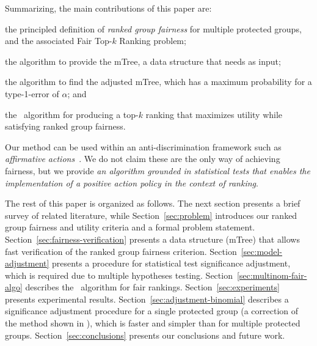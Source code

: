 Summarizing, the main contributions of this paper are:
\begin{compactenum}
	\item the principled definition of \emph{ranked group fairness} for multiple protected groups, and the associated  {\sc Fair Top-$k$ Ranking problem};
	\item the \algoComputeMTree algorithm to provide the mTree, a data structure that \algoFAIR needs as input;
	\item the \algoCorrect algorithm to find the adjusted mTree, which has a maximum probability for a type-1-error of $\alpha$; and
	\item the \algoFAIR\ algorithm for producing a top-$k$ ranking that maximizes utility while satisfying ranked group fairness.
\end{compactenum}

Our method can be used within an anti-discrimination framework such as \emph{affirmative actions}~\cite{sowell2005affirmative}.
%
We do not claim these are the only way of achieving fairness, but we provide \emph{an algorithm grounded in statistical tests that enables the implementation of a positive action policy in the context of ranking}.

The rest of this paper is organized as follows.
%
The next section presents a brief survey of related literature,
%
while Section~\ref{sec:problem} introduces our ranked group fairness and utility criteria and a formal problem statement.
%
Section~\ref{sec:fairness-verification} presents a data structure (mTree) that allows fast verification of the ranked group fairness criterion.
%
Section~\ref{sec:model-adjustment} presents a procedure for statistical test significance adjustment, which is required due to multiple hypotheses testing.
%
Section~\ref{sec:multinom-fair-algo} describes the \algoFAIR\ algorithm for fair rankings.
%
Section~\ref{sec:experiments} presents experimental results.
%
Section~\ref{sec:adjustment-binomial} describes a significance adjustment procedure for a single protected group (a correction of the method shown in \cite{zehlike2017fair}), which is faster and simpler than for multiple protected groups.
%
Section~\ref{sec:conclusions} presents our conclusions and future work.
